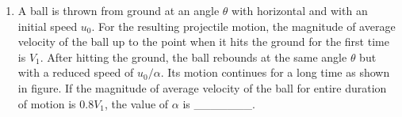 
\begin{enumerate}
\item A ball is thrown from ground at an angle $\theta$ with horizontal and with an initial speed $u_0$. For the resulting projectile motion, the magnitude of average velocity of the ball up to the point when it hits the ground for the first time is $V_1$. After hitting the ground, the ball rebounds at the same angle $\theta$ but with a reduced speed of $u_0/\alpha$. Its motion continues for a long time as shown in figure. If the magnitude of average velocity of the ball for entire duration of motion is $0.8 V_1$, the value of $\alpha$ is \_\_\_\_\_\_\_.

\begin{center}
\end{center}

\end{enumerate}

